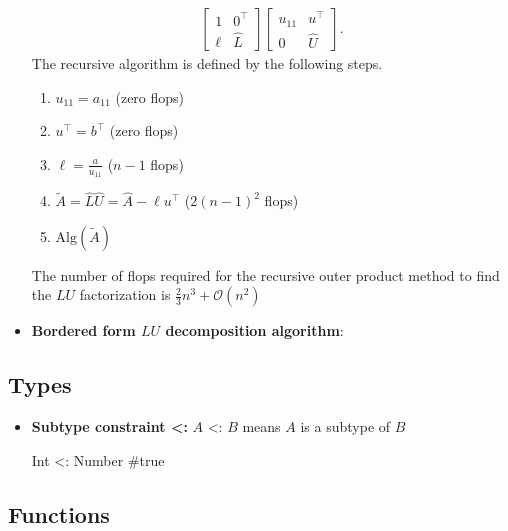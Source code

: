 \documentclass{report}
\begin{document}
\begin{itemize}
\begin{align*}
\begin{bmatrix}
                    1 & 0^{\top} \\
                    \ell & \hat{L}
                \end{bmatrix}
                \begin{bmatrix}
                    u_{11} & u^{\top} \\
                    0 & \hat{U}
                \end{bmatrix}
            .\end{align*}
            The recursive algorithm is defined by the following steps.
            \begin{enumerate}
                \item $u_{11} = a_{11} $ (zero flops)
                \item $u^{\top} = b^{\top} $ (zero flops)
                \item $\ell = \frac{a}{u_{11}} $ ($n-1$ flops) 
                \item $\tilde{A} = \hat{L}\hat{U} = \hat{A} - \ell u^{\top} $ ($2(n-1)^{2}$ flops)
                \item $\text{Alg}(\tilde{A})$
            \end{enumerate}
            The number of flops required for the recursive outer product method to find the $LU$ factorization is $\frac{2}{3}n^{3} + \mathcal{O}(n^{2}) $
        \item \textbf{Bordered form $LU$ decomposition algorithm}:




    \end{itemize}



    \pagebreak 
    \bigbreak \noindent 
    \subsection{Types}
    \bigbreak \noindent 
    \begin{itemize}
        \item \textbf{Subtype constraint <:} $A$ <: $B$ means $A$ is a subtype of $B$
            \bigbreak \noindent 
            \begin{jlcode}
            Int <: Number #true
            \end{jlcode}
    \end{itemize}

    \pagebreak 
    \subsection{Functions}
    \begin{itemize}
        
    \end{itemize}
\end{document}
